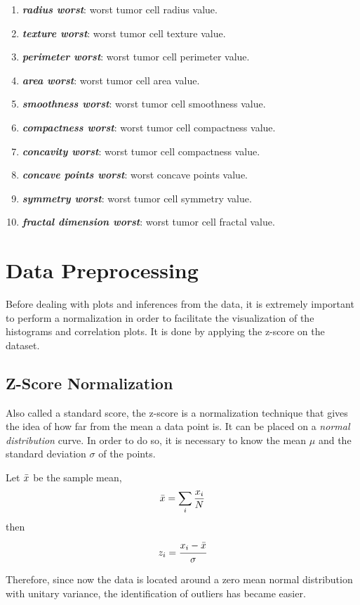 \documentclass[conference]{IEEEtran}
\begin{document}
\begin{enumerate}
     \item \textbf{\textit{radius worst}}: worst tumor cell radius value.
     \item \textbf{\textit{texture worst}}: worst tumor cell texture value.
     \item \textbf{\textit{perimeter worst}}: worst tumor cell perimeter value.
     \item \textbf{\textit{area worst}}: worst tumor cell area value.
     \item \textbf{\textit{smoothness worst}}: worst tumor cell smoothness value. 
     \item \textbf{\textit{compactness worst}}: worst tumor cell compactness value.
     
     \item \textbf{\textit{concavity worst}}: worst tumor cell compactness value.
     \item \textbf{\textit{concave points worst}}: worst concave points value.
     \item \textbf{\textit{symmetry worst}}: worst tumor cell symmetry value.
     \item \textbf{\textit{fractal dimension worst}}: worst tumor cell fractal value.
     
\end{enumerate}

\section{Data Preprocessing}
Before dealing with plots and inferences from the data, it is extremely important to 
perform a normalization in order to facilitate the visualization of the histograms 
and correlation plots. It is done by applying the z-score on the dataset.

\subsection{Z-Score Normalization}

Also called a standard score, the z-score is a normalization technique that gives the 
idea of how far from the mean a data point is. It can be placed on a 
\textit{normal distribution} curve. In order to do so, it is necessary to know the 
mean $\mu$ and the standard deviation $\sigma$ of the points.

Let $\Bar{x}$ be the sample mean,
$$\Bar{x} = \sum_i \frac{x_i}{N}$$
then
$$z_i = \cfrac{x_i - \Bar{x}}{\sigma}$$

Therefore, since now the data is located around a zero mean normal distribution with 
unitary variance, the identification of outliers has became easier.
\end{document}

